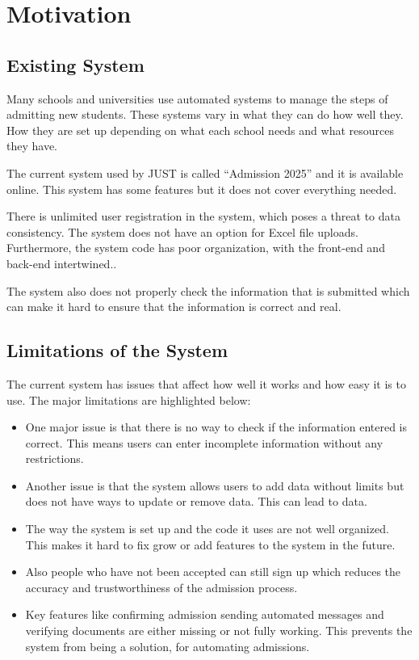 \section{Motivation}

\subsection{Existing System}

Many schools and universities use automated systems to manage the steps of admitting new students. These systems vary in what they can do how well they. How they are set up depending on what each school needs and what resources they have.

\medskip

\noindent The current system used by JUST is called ``Admission 2025'' and it is available online. This system has some features but it does not cover everything needed.

\medskip

\noindent There is unlimited user registration in the system, which poses a threat to data consistency. The system does not have an option for Excel file uploads. Furthermore, the system code has poor organization, with the front-end and back-end intertwined..

\medskip

\noindent The system also does not properly check the information that is submitted which can make it hard to ensure that the information is correct and real.

\subsection{Limitations of the System}

\noindent The current system has issues that affect how well it works and how easy it is to use. The major limitations are highlighted below:

\begin{itemize}
    \item One major issue is that there is no way to check if the information entered is correct. This means users can enter incomplete information without any restrictions.
    \item Another issue is that the system allows users to add data without limits but does not have ways to update or remove data. This can lead to data.
    \item The way the system is set up and the code it uses are not well organized. This makes it hard to fix grow or add features to the system in the future.
    \item Also people who have not been accepted can still sign up which reduces the accuracy and trustworthiness of the admission process.
    \item Key features like confirming admission sending automated messages and verifying documents are either missing or not fully working. This prevents the system from being a solution, for automating admissions.
\end{itemize}